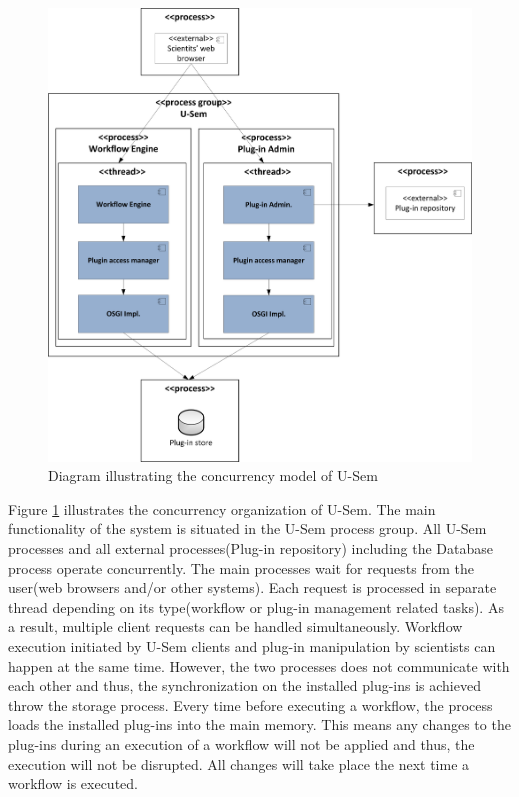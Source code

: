 \begin{figure}[h!]
  \centering
  	\includegraphics[scale=0.70]{plug-in/layers/concur.png}
  \caption{Diagram illustrating the concurrency model of U-Sem}
  \label{fig_conc}
\end{figure}

Figure \ref{fig_conc} illustrates the concurrency organization of U-Sem. The main functionality of the system is situated in the U-Sem process group. All U-Sem processes and all external processes(Plug-in repository) including the Database process operate concurrently. The main processes wait for requests from the user(web browsers and/or other systems). Each request is processed in separate thread depending on its type(workflow or plug-in management related tasks). As a result, multiple client requests can be handled simultaneously. Workflow execution initiated by U-Sem clients and plug-in manipulation by scientists can happen at the same time. However, the two processes does not communicate with each other and thus, the synchronization on the installed plug-ins is achieved throw the storage process. Every time before executing a workflow, the process loads the installed plug-ins into the main memory. This means any changes to the plug-ins during an execution of a workflow will not be applied and thus, the execution will not be disrupted. All changes will take place the next time a workflow is executed.

